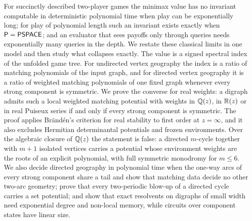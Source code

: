 For succinctly described two-player games the minimax value has no invariant computable in deterministic polynomial time when play can be exponentially long; for play of polynomial length such an invariant exists exactly when $\mathsf{P}=\mathsf{PSPACE}$; and an evaluator that sees payoffs only through queries needs exponentially many queries in the depth. We restate these classical limits in one model and then study what collapses exactly. The value is a signed spectral index of the unfolded game tree. For undirected vertex geography the index is a ratio of matching polynomials of the input graph, and for directed vertex geography it is a ratio of weighted matching polynomials of one fixed graph whenever every strong component is symmetric. We prove the converse for real weights: a digraph admits such a local weighted matching potential with weights in $\mathbb{Q}(z)$, in $\mathbb{R}(z)$ or in real Puiseux series if and only if every strong component is symmetric. The proof applies Br\"and\'en's criterion for real stability to first order at $z=\infty$, and it also excludes Hermitian determinantal potentials and frozen environments. Over the algebraic closure of $\mathbb{Q}(z)$ the statement is false: a directed $m$-cycle together with $m+1$ isolated vertices carries a potential whose environment weights are the roots of an explicit polynomial, with full symmetric monodromy for $m\le6$. We also decide directed geography in polynomial time when the one-way arcs of every strong component share a tail and show that matching data decide no other two-arc geometry; prove that every two-periodic blow-up of a directed cycle carries a set potential; and show that exact resolvents on digraphs of small width need exponential degree and non-local memory, while circuits over component states have linear size.
